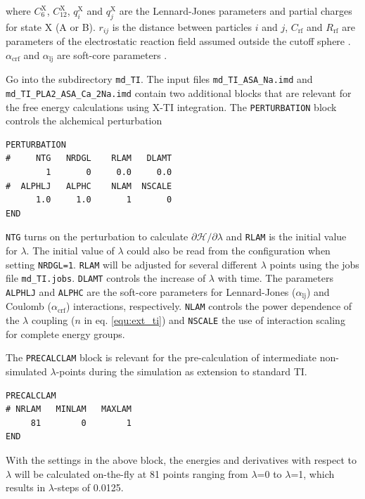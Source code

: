 \noindent where $C_{6}^{\text{X}}$, $C_{12}^{\text{X}}$, $q_i^{\text{X}}$ and $q_j^{\text{X}}$ are the Lennard-Jones parameters and partial charges for state X (A or B). $r_{ij}$ is the distance between particles $i$ and $j$, $C_{\text{rf}}$ and $R_{\text{rf}}$ are parameters of the electrostatic reaction field assumed outside the cutoff sphere \cite{Tironi1995}. 
$\alpha_{\text{crf}}$ and $\alpha_{\text{lj}}$ are soft-core parameters \cite{Beutler1994}. 

Go into the subdirectory \texttt{md\_TI}. The input files \texttt{md\_TI\_ASA\_Na.imd} and \texttt{md\_TI\_PLA2\_ASA\_Ca\_2Na.imd} contain two additional blocks that are relevant for the free energy calculations using X-TI integration. The \texttt{PERTURBATION} block controls the alchemical perturbation 
\begin{lstlisting}
PERTURBATION
#     NTG   NRDGL    RLAM   DLAMT 
        1       0     0.0     0.0 
#  ALPHLJ   ALPHC    NLAM  NSCALE 
      1.0     1.0       1       0 
END
\end{lstlisting}
\texttt{NTG} turns on the perturbation to calculate $\partial\mathcal{H}/\partial\lambda$ and \texttt{RLAM} is the initial value for $\lambda$. The initial value of $\lambda$ could also be read from the configuration when setting \texttt{NRDGL=1}. \texttt{RLAM} will be adjusted for several different $\lambda$ points using the jobs file \texttt{md\_TI.jobs}. \texttt{DLAMT} controls the increase of $\lambda$ with time. The parameters \texttt{ALPHLJ} and \texttt{ALPHC} are the soft-core parameters for Lennard-Jones ($\alpha_{\text{lj}}$) and Coulomb ($\alpha_{\text{crf}}$) interactions, respectively. \texttt{NLAM} controls the power dependence of the $\lambda$ coupling ($n$ in eq. \ref{equ:ext_ti}) and \texttt{NSCALE} the use of interaction scaling for complete energy groups.  

The \texttt{PRECALCLAM} block is relevant for the pre-calculation of intermediate non-simulated $\lambda$-points during the simulation as extension to standard TI. 
\begin{lstlisting}
PRECALCLAM
# NRLAM   MINLAM   MAXLAM
     81        0        1
END
\end{lstlisting}
With the settings in the above block, the energies and derivatives with respect to $\lambda$ will be calculated on-the-fly at 81 points ranging from $\lambda$=0 to $\lambda$=1, which results in $\lambda$-steps of 0.0125.


